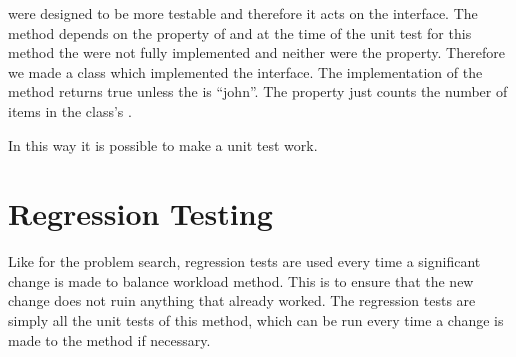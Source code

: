  were designed to be more testable and therefore it acts on the  interface. 
The method depends on the  property of  and at the time of the unit test for this method the  were not fully implemented and neither were the  property. 
Therefore we made a  class which implemented the  interface.
The  implementation of the  method returns true unless the  is ``john''. 
The  property just counts the number of items in the  class's . 

In this way it is possible to make a unit test work.

\section{Regression Testing}
\label{sec:regression_balance_workload}
Like for the problem search, regression tests are used every time a significant change is made to balance workload method.
This is to ensure that the new change does not ruin anything that already worked.
The regression tests are simply all the unit tests of this method, which can be run every time a change is made to the method if necessary.
